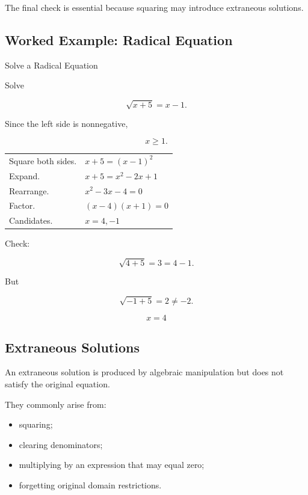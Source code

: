 The final check is essential because squaring may introduce extraneous
solutions.

\subsection{Worked Example: Radical Equation}
\label{subsec:worked-radical-equation}

\begin{workedexamplebox}{Solve a Radical Equation}

Solve

\[ \sqrt{x+5}=x-1. \]

Since the left side is nonnegative,

\[ x\geq1. \]

\begin{tabularx}{\textwidth}{@{}>{\raggedright\arraybackslash}p{}X@{}}
Square both sides. & \(x+5=(x-1)^2\)\\
Expand. & \(x+5=x^2-2x+1\)\\
Rearrange. & \(x^2-3x-4=0\)\\
Factor. & \((x-4)(x+1)=0\)\\
Candidates. & \(x=4,-1\)
\end{tabularx}

Check:

\[ \sqrt{4+5}=3=4-1. \]

But

\[ \sqrt{-1+5}=2\neq-2. \]

\begin{answerbox}
\[ x=4 \]
\end{answerbox}
\end{workedexamplebox}

\subsection{Extraneous Solutions}
\label{subsec:extraneous-solutions}

An extraneous solution is produced by algebraic manipulation but does not
satisfy the original equation.

They commonly arise from:

\begin{itemize}
    \item squaring;
    \item clearing denominators;
    \item multiplying by an expression that may equal zero;
    \item forgetting original domain restrictions.
\end{itemize}

